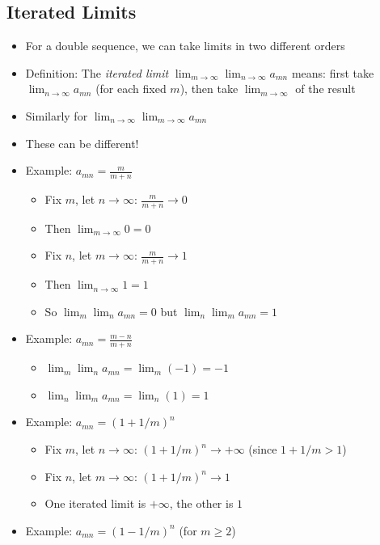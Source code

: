 \documentclass[
  10pt,
  letterpaper,
]{scrbook}
\providecommand{\tightlist}{%
  \setlength{\itemsep}{0pt}\setlength{\parskip}{0pt}}
\begin{document}
\subsection{Iterated Limits}\label{iterated-limits-1}

\begin{itemize}
\item
  For a double sequence, we can take limits in two different orders
\item
  Definition: The \emph{iterated limit}
  \(\lim_{m \to \infty} \lim_{n \to \infty} a_{mn}\) means: first take
  \(\lim_{n \to \infty} a_{mn}\) (for each fixed \(m\)), then take
  \(\lim_{m \to \infty}\) of the result
\item
  Similarly for \(\lim_{n \to \infty} \lim_{m \to \infty} a_{mn}\)
\item
  These can be different!
\item
  Example: \(a_{mn} = \frac{m}{m+n}\)

  \begin{itemize}
  \tightlist
  \item
    Fix \(m\), let \(n \to \infty\): \(\frac{m}{m+n} \to 0\)
  \item
    Then \(\lim_{m \to \infty} 0 = 0\)
  \item
    Fix \(n\), let \(m \to \infty\): \(\frac{m}{m+n} \to 1\)
  \item
    Then \(\lim_{n \to \infty} 1 = 1\)
  \item
    So \(\lim_m \lim_n a_{mn} = 0\) but \(\lim_n \lim_m a_{mn} = 1\)
  \end{itemize}
\item
  Example: \(a_{mn} = \frac{m - n}{m + n}\)

  \begin{itemize}
  \tightlist
  \item
    \(\lim_m \lim_n a_{mn} = \lim_m (-1) = -1\)
  \item
    \(\lim_n \lim_m a_{mn} = \lim_n (1) = 1\)
  \end{itemize}
\item
  Example: \(a_{mn} = (1 + 1/m)^n\)

  \begin{itemize}
  \tightlist
  \item
    Fix \(m\), let \(n \to \infty\): \((1 + 1/m)^n \to +\infty\) (since
    \(1 + 1/m > 1\))
  \item
    Fix \(n\), let \(m \to \infty\): \((1 + 1/m)^n \to 1\)
  \item
    One iterated limit is \(+\infty\), the other is \(1\)
  \end{itemize}
\item
  Example: \(a_{mn} = (1 - 1/m)^n\) (for \(m \geq 2\))


\end{itemize}
\end{document}
